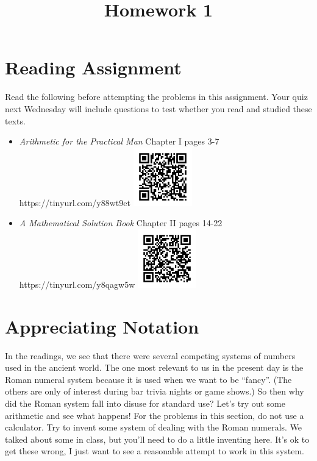 \documentclass{article}
\title{Homework 1}
\date{}
\begin{document}
\maketitle

\section*{Reading Assignment}
Read the following before attempting the problems in this assignment.  
Your quiz next Wednesday will include questions to test whether you read and studied
these texts.
\begin{itemize}
    \item {\em Arithmetic for the Practical Man} Chapter I pages 3-7 \newline
    https://tinyurl.com/y88wt9et\newline
    \includegraphics[width=1in]{readings/practical1}
    
    \item {\em A Mathematical Solution Book} Chapter II pages 14-22 \newline
    https://tinyurl.com/y8qagw5w\newline
    \includegraphics[width=1in]{readings/solution1}
\end{itemize}

\section*{Appreciating Notation}
In the readings, we see that there were several competing systems of numbers used
in the ancient world.  The one most relevant to us in the present day is the Roman
numeral system because it is used when we want to be ``fancy''.  (The others are only
of interest during bar trivia nights or game shows.)  So then why did the Roman 
system fall into disuse for standard use?  Let's try out some arithmetic and 
see what happens! For the problems in this section, do not use a calculator.  
Try to invent some system of dealing with the Roman numerals. We talked about some in
class, but you'll need to do a little inventing here.  It's ok to get these wrong, 
I just want to see a reasonable attempt to work in this system.
\end{document}
